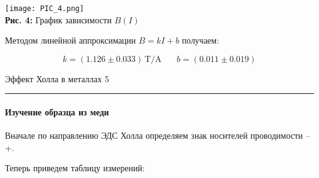 \documentclass[12pt,a4paper]{scrartcl}
\begin{document}
	\begin{center}
		\texttt{[image: PIC\_4.png]}
		\\\textbf{Рис. 4:} График зависимости $B(I)$
	\end{center}

	Методом линейной аппроксимации $B = kI + b$ получаем:
	
	$$k = (1.126 \pm 0.033)\, \text{T}/\text{A} \ \ \ \ \ \ \ \ b = (0.011 \pm 0.019)$$
	
	\newpage
	
	
	\begin{flushleft}
		\footnotesize{Эффект Холла в металлах} \hspace{\fill} \footnotesize{5}
		\\[-0.3cm]\noindent\rule{\textwidth}{0.3pt}
	\end{flushleft}	
	
	\paragraph{Изучение образца из меди} \hfill
	
	Вначале по направлению ЭДС Холла определяем знак носителей проводимости -- +.
	
	Теперь приведем таблицу измерений:
	
\end{document}
